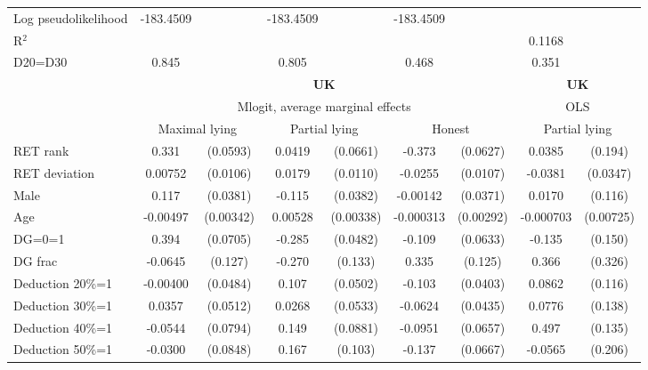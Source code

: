 \begin{tabular}{l|cccccc|cc}
Log pseudolikelihood  & -183.4509   &         &     -183.4509             &         &      -183.4509            &         &           &   \\ 
R$^2$      &                  &         &                  &         &                  &         &          0.1168  &   \\ 
D20=D30         &    0.845         &         &    0.805         &         &    0.468         &         &    0.351         &         \\
\hline\hline
&\multicolumn{6}{c|}{\bf UK}&\multicolumn{2}{c}{\bf UK}\\ &\multicolumn{6}{c|}{Mlogit, average marginal effects }&\multicolumn{2}{c}{OLS}\\
                &\multicolumn{2}{c}{Maximal lying}&\multicolumn{2}{c}{Partial lying}&\multicolumn{2}{c}{Honest}  &\multicolumn{2}{c}{Partial lying}\\
\hline
RET rank        &    0.331\sym{***}& (0.0593)&   0.0419         & (0.0661)&   -0.373\sym{***}& (0.0627)&   0.0385         &  (0.194)\\
RET deviation   &  0.00752         & (0.0106)&   0.0179         & (0.0110)&  -0.0255\sym{**} & (0.0107)&  -0.0381         & (0.0347)\\
Male            &    0.117\sym{***}& (0.0381)&   -0.115\sym{***}& (0.0382)& -0.00142         & (0.0371)&   0.0170         &  (0.116)\\
Age             & -0.00497         &(0.00342)&  0.00528         &(0.00338)&-0.000313         &(0.00292)&-0.000703         &(0.00725)\\
DG=0=1          &    0.394\sym{***}& (0.0705)&   -0.285\sym{***}& (0.0482)&   -0.109\sym{*}  & (0.0633)&   -0.135         &  (0.150)\\
DG frac         &  -0.0645         &  (0.127)&   -0.270\sym{**} &  (0.133)&    0.335\sym{***}&  (0.125)&    0.366         &  (0.326)\\
Deduction 20\%=1& -0.00400         & (0.0484)&    0.107\sym{**} & (0.0502)&   -0.103\sym{**} & (0.0403)&   0.0862         &  (0.116)\\
Deduction 30\%=1&   0.0357         & (0.0512)&   0.0268         & (0.0533)&  -0.0624         & (0.0435)&   0.0776         &  (0.138)\\
Deduction 40\%=1&  -0.0544         & (0.0794)&    0.149\sym{*}  & (0.0881)&  -0.0951         & (0.0657)&    0.497\sym{***}&  (0.135)\\
Deduction 50\%=1&  -0.0300         & (0.0848)&    0.167         &  (0.103)&   -0.137\sym{**} & (0.0667)&  -0.0565         &  (0.206)\\

\end{tabular}
